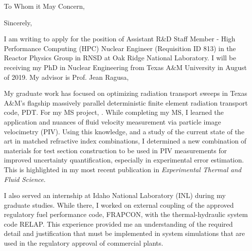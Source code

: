 \documentclass[11pt,letterpaper,roman]{moderncv}        %
\begin{document}
\date{\today}
\opening{To Whom it May Concern,}
\closing{Sincerely,}

\makelettertitle

I am writing to apply for the position of Assistant R\&D Staff Member - High Performance Computing (HPC) Nuclear Engineer (Requisition ID 813) in the Reactor Physics Group in RNSD at Oak Ridge National Laboratory. I will be receiving my PhD in Nuclear Engineering from Texas A\&M University in August of 2019. My advisor is Prof. Jean Ragusa, %

My graduate work has focused on optimizing radiation transport sweeps in Texas A\&M's flagship massively parallel deterministic finite element radiation transport code, PDT. For my MS project, . While completing my MS, I learned the application and nuances of fluid velocity measurement via particle image velocimetry (PIV). Using this knowledge, and a study of the current state of the art in matched refractive index combinations, I determined a new combination of materials for test section construction to be used in PIV measurements for improved uncertainty quantification, especially in experimental error estimation. This is highlighted in my most recent publication in \emph{Experimental Thermal and Fluid Science}. 



I also served an internship at Idaho National Laboratory (INL) during my graduate studies. While there, I worked on external coupling of the approved regulatory fuel performance code, FRAPCON, with the thermal-hydraulic system code RELAP. This experience provided me an understanding of the required detail and justification that must be implemented in system simulations that are used in the regulatory approval of commercial plants.
\end{document}
